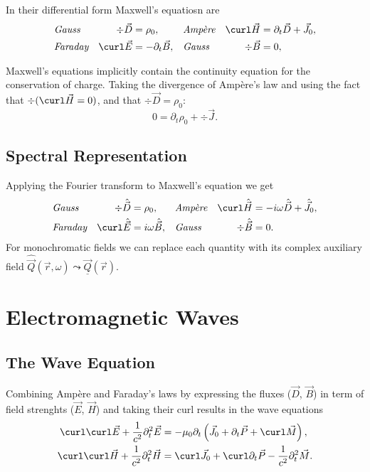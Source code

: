 \documentclass[margin=tiny]{hsrzf}
\newcommand{\cvec}[1]{\underline{\vec{#1}}}
\begin{document}
In their differential form Maxwell's equatiosn are
\begin{align*}
  &\textit{Gauss} &
    \div \vec{D} &= \rho_0, &
  &\textit{Ampère} &
    \curl \vec{H} &= \partial_t \vec{D} + \vec{J}_0, \\
  &\textit{Faraday} &
    \curl \vec{E} &= - \partial_t \vec{B}, &
  &\textit{Gauss} &
    \div \vec{B} &= 0,
\end{align*}

Maxwell's equations implicitly contain the continuity equation for the
conservation of charge. Taking the divergence of Ampère's law and using the
fact that $\div(\curl \vec{H} = 0)$, and that $\div \vec{D} = \rho_0$:
\[
  0 = \partial_t \rho_0 + \div \vec{J}.
\]

\subsection{Spectral Representation}

Applying the Fourier transform to Maxwell's equation we get
\begin{align*}
  &\textit{Gauss} &
    \div \hat{\vec{D}} &= \rho_0, &
  &\textit{Ampère} &
    \curl \hat{\vec{H}} &= -i\omega \hat{\vec{D}} + \hat{\vec{J}}_0, \\
  &\textit{Faraday} &
    \curl \hat{\vec{E}} &= i\omega \hat{\vec{B}}, &
  &\textit{Gauss} &
    \div \hat{\vec{B}} &= 0.
\end{align*}
For monochromatic fields we can replace each quantity with its complex
auxiliary field $\hat{\vec{Q}}(\vec{r}, \omega) \leadsto \cvec{Q}(\vec{r})$.

\section{Electromagnetic Waves}

\subsection{The Wave Equation}

Combining Ampère and Faraday's laws by expressing the fluxes ($\vec{D}$,
$\vec{B}$) in term of field strenghts ($\vec{E}$, $\vec{H}$) and taking their
curl results in the wave equations
\begin{subequations}
  \begin{align*}
    \curl \curl \vec{E} + \frac{1}{c^2} \partial^2_t \vec{E}
      &= - \mu_0 \partial_t \left(
          \vec{J}_0 + \partial_t \vec{P} + \curl \vec{M}
        \right), \\
    \curl \curl \vec{H} + \frac{1}{c^2} \partial^2_t \vec{H}
      &= \curl \vec{J}_0 + \curl \partial_t \vec{P}
          - \frac{1}{c^2} \partial_t^2 \vec{M}.
  \end{align*}
\end{subequations}
\end{document}
